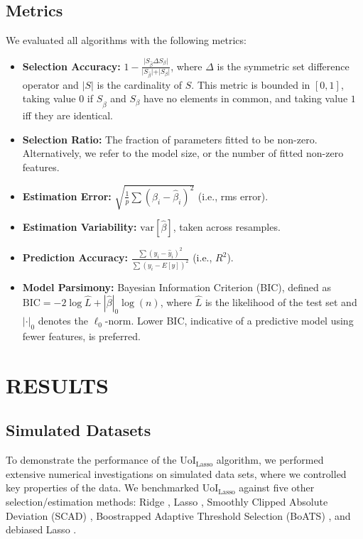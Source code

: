 \documentclass[letterpaper, 10 pt, conference]{ieeeconf}  %
\begin{document}
\subsection{Metrics}
We evaluated all algorithms with the following metrics:
\begin{itemize}
    \item \textbf{Selection Accuracy:} $1-\frac{\vert S_{\hat{\beta}} \Delta S_{\beta}\vert}{|S_{\hat{\beta}}\vert + \vert S_{\beta} \vert}$, where $\Delta$ is the symmetric set difference operator and $|S|$ is the cardinality of $S$. This metric is bounded in $[0, 1]$, taking value $0$ if $S_{\hat{\beta}}$ and $S_{\beta}$ have no elements in common, and taking value $1$ iff they are identical.
    \item \textbf{Selection Ratio:} The fraction of parameters fitted to be non-zero. Alternatively, we refer to the model size, or the number of fitted non-zero features.
    \item \textbf{Estimation Error:} $\sqrt{\frac{1}{p} \sum (\beta_i - \hat{\beta}_i)^2}$ (i.e., rms error).
    \item \textbf{Estimation Variability:} $\text{var}[\hat{\beta}]$, taken across resamples.
    \item \textbf{Prediction Accuracy:} $\frac{\sum \left(y_i - \hat{y}_i\right)^2}{\sum \left(y_i - E[y]\right)^2}$ (i.e., $R^2$).
    \item \textbf{Model Parsimony:} Bayesian Information Criterion (BIC), defined as $\text{BIC} = -2\log \hat{L} + |\hat{\beta}|_0 \log(n)$, where $\hat{L}$ is the likelihood of the test set and $|\cdot|_0$ denotes the $\ell_0$-norm. Lower BIC, indicative of a predictive model using fewer features, is preferred.
\end{itemize}

\section{RESULTS}
\subsection{Simulated Datasets}
To demonstrate the performance of the UoI$_{\text{Lasso}}$ algorithm, we performed extensive numerical investigations on simulated data sets, where we controlled key properties of the data. We benchmarked UoI$_{\text{Lasso}}$ against five other selection/estimation methods: Ridge \cite{elements}, Lasso \cite{lasso}, Smoothly Clipped Absolute Deviation (SCAD) \cite{scad}, Boostrapped Adaptive Threshold Selection (BoATS) \cite{boats}, and debiased Lasso \cite{dbLasso}. 
\end{document}
